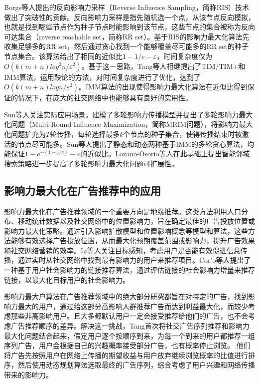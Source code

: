 Borgs等人\cite{borgs2014maximizing}提出的反向影响力采样（Reverse Influence Sampling，简称RIS）技术做出了突破性的贡献。反向影响力采样是指先随机选一个点，从该节点反向模拟，也就是找到哪些节点作为种子节点时能影响到该节点，这些节点的集合被称为反向可达集合（reverse reachable set，简称RR set）。基于RIS的影响力最大化算法先收集足够多的RR set，然后通过贪心找到一个能够覆盖尽可能多的RR set的种子节点集合。该算法给出了相同的近似比$1-1/e-\varepsilon$，时间复杂度仅为$O(k(m+n)log^2n/\varepsilon^2)$。基于这一思路，Tang等人相继提出了TIM/TIM+\cite{tang2014influence}和IMM\cite{tang2015influence}算法，运用鞅论的方法，对时间复杂度进行了优化，达到了$O(k(m+n)logn/\varepsilon^2)$。IMM算法的出现使得影响力最大化算法在近似比得到保证的情况下，在庞大的社交网络中也能够具有良好的实用性。

Sun等人关注实际应用场景，建模了多轮影响力传播模型并提出了多轮影响力最大化问题（Multi-Round Influence Maximization，简称MRIM问题）\parencite{sun2018multi}，将影响力最大化问题扩充为$T$轮传播，每轮选择最多$k$个节点的种子集合，使得传播结束时被激活的节点尽可能多。Sun等人提出了静态和动态两种基于IMM的多轮贪心算法，均能保证$1-e^{-(1-1/e)}-\varepsilon$的近似比。Lozano-Osorio等人\cite{lozano2022multi}在此基础上提出智能邻域搜索策略进一步提高了多轮影响力最大化问题可扩展性。


\subsection{影响力最大化在广告推荐中的应用}

影响力最大化在广告推荐领域的一个重要方向是地缘推荐\cite{zhang2020geodemographic,zeng2021business,saleem2019effective}。这类方法利用人口分布、移动统计数据以及社交网络中的位置影响力，旨在确定最佳的广告投放位置或影响力最大化策略。通过引入影响扩散模型和位置影响概念等模型和算法，这些方法能够有效选择广告投放位置，从而最大化预期覆盖范围或影响力，提升广告效果和社交网络营销的效率。Li等人\cite{li2015real}关注目标感知，考虑用户是否能有效促进信息传播，通过实时从社交网络中找到最有影响力的用户来推荐项目。Cor{'o}等人\cite{coro2021link}提出了一种基于用户社会影响力的链接推荐算法，通过评估链接的社会影响力增量来推荐链接，以最大化目标用户的社会影响力。

影响力最大户算法在广告推荐领域中的绝大部分研究都旨在对特定的广告，找到影响力最大的用户，通过给这部分高影响人群推荐广告而达到利益最大化，而较少考虑那些非高影响用户。且大多都默认用户一定会接受推荐给他们的广告，也不会考虑广告推荐顺序的差异。解决这一挑战，Tang\cite{tang2018social}首次将社交广告序列推荐和影响力最大化问题结合起来，假定用户逐个按顺序到来，为每一个到来的用户都推荐一组序列广告，用户会根据自己的兴趣概率接受部分广告，也有概率停止浏览。 他们将广告先按照用户在网络上传播的期望收益与用户放弃继续浏览概率的比值进行排序，然后使用动态规划算法选取最终的广告序列，综合考虑了用户兴趣和网络传播带来的影响力。

